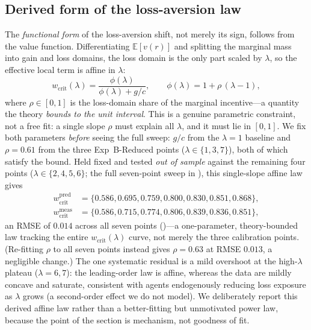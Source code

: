 \documentclass[letterpaper]{article}
\theoremstyle{plain}
\newcommand{\wcrit}{w_{\mathrm{crit}}}
\begin{document}
\subsection{Derived form of the loss-aversion law}
The \emph{functional form} of the loss-aversion shift, not merely its sign,
follows from the value function. Differentiating $\mathbb{E}[v(r)]$ and
splitting the marginal mass into gain and loss domains, the loss domain is
the only part scaled by $\lambda$, so the effective local term is affine in
$\lambda$:
\begin{equation}
  \wcrit(\lambda)=\frac{\phi(\lambda)}{\phi(\lambda)+g/c},
  \qquad \phi(\lambda)=1+\rho\,(\lambda-1),
  \label{eq:wcrit_lambda}
\end{equation}
where $\rho\in[0,1]$ is the loss-domain share of the marginal incentive---a
quantity the theory \emph{bounds to the unit interval}. This is a genuine
parametric constraint, not a free fit: a single slope $\rho$ must explain
all $\lambda$, and it must lie in $[0,1]$. We fix both parameters
\emph{before} seeing the full sweep: $g/c$ from the $\lambda{=}1$ baseline
and $\rho=0.61$ from the three Exp~B-Reduced points
($\lambda\in\{1,3,7\}$), both of which satisfy the bound. Held fixed and
tested \emph{out of sample} against the remaining four points
($\lambda\in\{2,4,5,6\}$; the full seven-point sweep in
), this single-slope affine law gives
\begin{equation*}
\begin{aligned}
\wcrit^{\text{pred}}&=\{0.586,0.695,0.759,0.800,0.830,0.851,0.868\},\\
\wcrit^{\text{meas}}&=\{0.586,0.715,0.774,0.806,0.839,0.836,0.851\},
\end{aligned}
\end{equation*}
an RMSE of $0.014$ across all seven points
()---a one-parameter, theory-bounded
law tracking the entire $\wcrit(\lambda)$ curve, not merely the three
calibration points. (Re-fitting $\rho$ to all seven points instead gives
$\rho=0.63$ at RMSE $0.013$, a negligible change.) The one systematic residual is a mild overshoot at the high-$\lambda$
plateau ($\lambda{=}6,7$): the leading-order law is affine, whereas the data are
mildly concave and saturate, consistent with agents endogenously reducing loss
exposure as $\lambda$ grows (a second-order effect we do not model). We deliberately report this derived affine law
rather than a better-fitting but unmotivated power law, because the point of
the section is mechanism, not goodness of fit.
\end{document}
